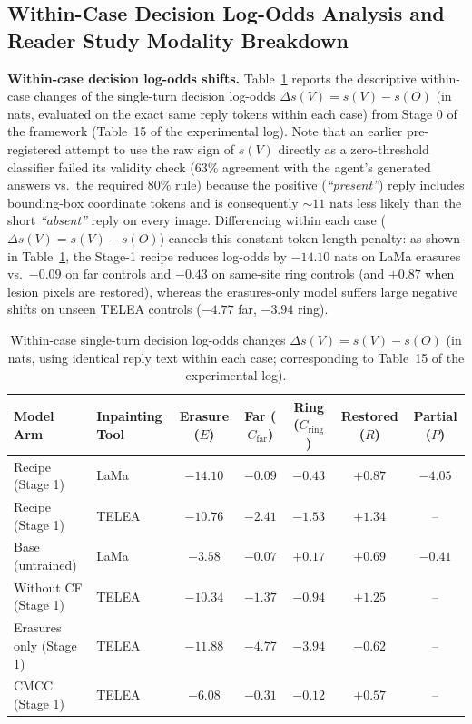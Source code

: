 \documentclass{article} %
\begin{document}
\subsection{Within-Case Decision Log-Odds Analysis and Reader Study Modality Breakdown}
\textbf{Within-case decision log-odds shifts.} Table~\ref{tab:app_log_odds} reports the descriptive within-case changes of the single-turn decision log-odds $\Delta s(V) = s(V) - s(O)$ (in nats, evaluated on the exact same reply tokens within each case) from Stage 0 of the framework (Table~15 of the experimental log). Note that an earlier pre-registered attempt to use the raw sign of $s(V)$ directly as a zero-threshold classifier failed its validity check ($63\%$ agreement with the agent's generated answers vs.\ the required $80\%$ rule) because the positive (\emph{``present''}) reply includes bounding-box coordinate tokens and is consequently $\sim 11\text{ nats}$ less likely than the short \emph{``absent''} reply on every image. Differencing within each case ($\Delta s(V) = s(V) - s(O)$) cancels this constant token-length penalty: as shown in Table~\ref{tab:app_log_odds}, the Stage-1 recipe reduces log-odds by $-14.10\text{ nats}$ on LaMa erasures vs.\ $-0.09$ on far controls and $-0.43$ on same-site ring controls (and $+0.87$ when lesion pixels are restored), whereas the erasures-only model suffers large negative shifts on unseen TELEA controls ($-4.77$ far, $-3.94$ ring).

\begin{table}[h]
\caption{Within-case single-turn decision log-odds changes $\Delta s(V) = s(V) - s(O)$ (in nats, using identical reply text within each case; corresponding to Table~15 of the experimental log).}
\label{tab:app_log_odds}
\begin{center}
\small
\begin{tabular}{llccccc}
\toprule
\textbf{Model Arm} & \textbf{Inpainting Tool} & \textbf{Erasure ($E$)} & \textbf{Far ($C_{\text{far}}$)} & \textbf{Ring ($C_{\text{ring}}$)} & \textbf{Restored ($R$)} & \textbf{Partial ($P$)} \\
\midrule
Recipe (Stage 1) & LaMa & $-14.10$ & $-0.09$ & $-0.43$ & $+0.87$ & $-4.05$ \\
Recipe (Stage 1) & TELEA & $-10.76$ & $-2.41$ & $-1.53$ & $+1.34$ & -- \\
Base (untrained) & LaMa & $-3.58$ & $-0.07$ & $+0.17$ & $+0.69$ & $-0.41$ \\
Without CF (Stage 1) & TELEA & $-10.34$ & $-1.37$ & $-0.94$ & $+1.25$ & -- \\
Erasures only (Stage 1) & TELEA & $-11.88$ & $-4.77$ & $-3.94$ & $-0.62$ & -- \\
CMCC (Stage 1) & TELEA & $-6.08$ & $-0.31$ & $-0.12$ & $+0.57$ & -- \\
\bottomrule
\end{tabular}
\end{center}
\end{table}
\end{document}
